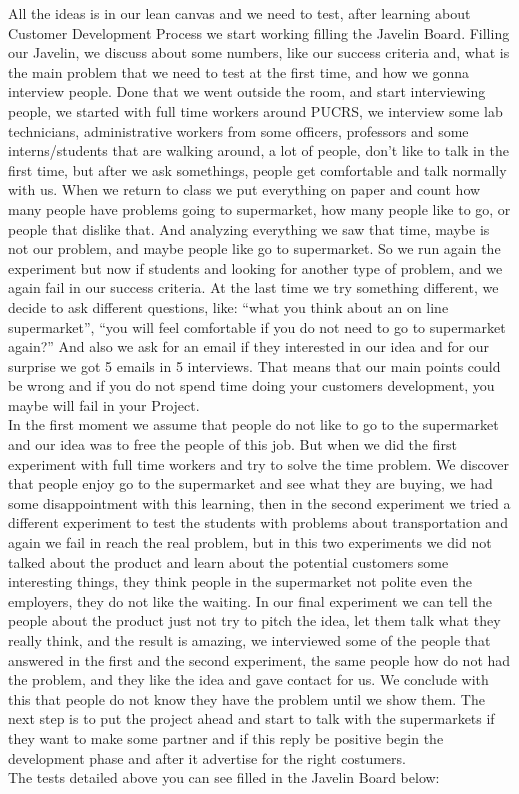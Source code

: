 \documentclass[12pt]{article}
\begin{document}
All the ideas is in our lean canvas and we need to test, after learning about 
Customer Development Process we start working filling the Javelin Board. 
Filling our Javelin, we discuss about some numbers, like our success criteria 
and, what is the main problem that we need to test at the first time, and 
how we gonna interview people.
Done that we went outside the room, and start interviewing people, we 
started with full time workers around PUCRS, we interview some lab 
technicians, administrative workers from some officers, professors and some 
interns/students that are walking around, a lot of people, don’t like to talk in 
the first time, but after we ask somethings, people get comfortable and talk 
normally with us.
When we return to class we put everything on paper and count how many 
people have problems going to supermarket, how many people like to go, 
or people that dislike that.
And analyzing everything we saw that time, maybe is not our problem, and 
maybe people like go to supermarket.
So we run again the experiment but now if students and looking for another
type of problem, and we again fail in our success criteria. At the last time we 
try something different, we decide to ask different questions, like: “what you 
think about an on line supermarket”, “you will feel comfortable if you do not
need to go to supermarket again?”
And also we ask for an email if they interested in our idea and for our 
surprise we got 5 emails in 5 interviews.
That means that our main points could be wrong and if you do not spend 
time doing your customers development, you maybe will fail in your Project. \\
In the first moment we assume that people do not like to go to the supermarket and our idea was to free the people of this job. But when we did the first experiment with full time workers and try to solve the time problem. We discover that people enjoy go to the supermarket and see what they are buying, we had some disappointment with this learning, then in the second experiment we tried a different experiment to test the students with problems about transportation and again we fail in reach the real problem, but in this two experiments we did not talked about the product and learn about the potential customers some interesting things, they think people in the supermarket not polite even the employers, they do not like the waiting. In our final experiment we can tell the people about the product just not try to pitch the idea, let them talk what they really think, and the result is amazing, we interviewed some of the people that answered in the first and the second experiment, the same people how do not had the problem, and they like the idea and gave contact for us. We conclude with this that people do not know they have the problem until we show them. The next step is to put the project ahead and start to talk with the supermarkets if they want to make some partner and if this reply be positive begin the development phase and after it advertise for the right costumers.\\
The tests detailed above you can see filled in the Javelin Board below: 
\end{document}
